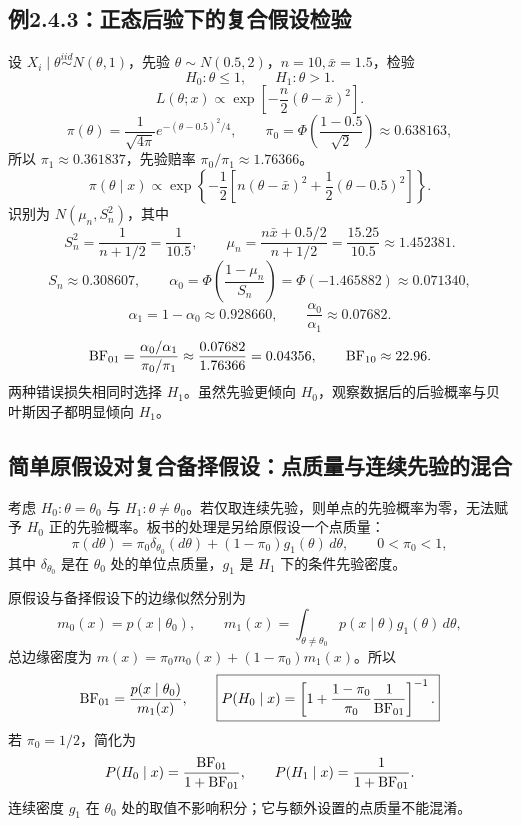 \subsection{例2.4.3：正态后验下的复合假设检验}
设 $X_i\mid\theta\overset{iid}{\sim}N(\theta,1)$，先验 $\theta\sim N(0.5,2)$，$n=10,\bar x=1.5$，检验
\[
H_0:\theta\leq1,\qquad H_1:\theta>1.
\]
\[
L(\theta;x)\propto\exp\left[-\frac n2(\theta-\bar x)^2\right].
\]
\[
\pi(\theta)=\frac1{\sqrt{4\pi}}e^{-(\theta-0.5)^2/4},
\qquad \pi_0=\Phi\left(\frac{1-0.5}{\sqrt2}\right)\approx0.638163,
\]
所以 $\pi_1\approx0.361837$，先验赔率 $\pi_0/\pi_1\approx1.76366$。
\[
\pi(\theta\mid x)\propto\exp\left\{-\frac12
\left[n(\theta-\bar x)^2+\frac12(\theta-0.5)^2\right]\right\}.
\]
识别为 $N(\mu_n,S_n^2)$，其中
\[
S_n^2=\frac1{n+1/2}=\frac1{10.5},\qquad
\mu_n=\frac{n\bar x+0.5/2}{n+1/2}
=\frac{15.25}{10.5}\approx1.452381.
\]
\[
S_n\approx0.308607,\qquad
\alpha_0=\Phi\left(\frac{1-\mu_n}{S_n}\right)
=\Phi(-1.465882)\approx0.071340,
\]
\[
\alpha_1=1-\alpha_0\approx0.928660,
\qquad\frac{\alpha_0}{\alpha_1}\approx0.07682.
\]
\[
\operatorname{BF}_{01}=\frac{\alpha_0/\alpha_1}{\pi_0/\pi_1}
\approx\frac{0.07682}{1.76366}=0.04356,\qquad
\operatorname{BF}_{10}\approx22.96.
\]
两种错误损失相同时选择 $H_1$。虽然先验更倾向 $H_0$，观察数据后的后验概率与贝叶斯因子都明显倾向 $H_1$。

\subsection{简单原假设对复合备择假设：点质量与连续先验的混合}
考虑 $H_0:\theta=\theta_0$ 与 $H_1:\theta\ne\theta_0$。若仅取连续先验，则单点的先验概率为零，无法赋予 $H_0$ 正的先验概率。板书的处理是另给原假设一个点质量：
\[
\pi(d\theta)=\pi_0\delta_{\theta_0}(d\theta)
+(1-\pi_0)g_1(\theta)\,d\theta,\qquad0<\pi_0<1,
\]
其中 $\delta_{\theta_0}$ 是在 $\theta_0$ 处的单位点质量，$g_1$ 是 $H_1$ 下的条件先验密度。

原假设与备择假设下的边缘似然分别为
\[
m_0(x)=p(x\mid\theta_0),\qquad
m_1(x)=\int_{\theta\ne\theta_0}p(x\mid\theta)g_1(\theta)\,d\theta,
\]
总边缘密度为 $m(x)=\pi_0m_0(x)+(1-\pi_0)m_1(x)$。所以
\[
\operatorname{BF}_{01}=\frac{p(x\mid\theta_0)}{m_1(x)},\qquad
\boxed{P(H_0\mid x)=\left[1+\frac{1-\pi_0}{\pi_0}\frac1{\operatorname{BF}_{01}}\right]^{-1}.}
\]
若 $\pi_0=1/2$，简化为
\[
P(H_0\mid x)=\frac{\operatorname{BF}_{01}}{1+\operatorname{BF}_{01}},\qquad
P(H_1\mid x)=\frac1{1+\operatorname{BF}_{01}}.
\]
连续密度 $g_1$ 在 $\theta_0$ 处的取值不影响积分；它与额外设置的点质量不能混淆。

